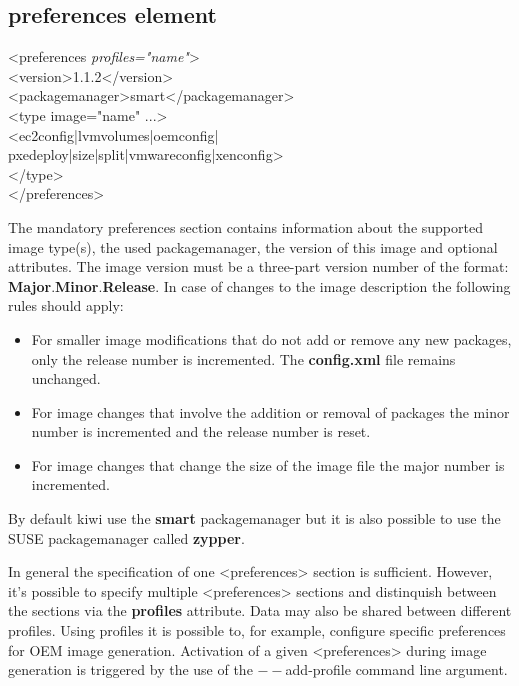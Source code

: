 \subsection{preferences element}
\begin{Command}{14cm}
<preferences \textit{profiles="name"}>\\
\hspace*{1cm}<version>1.1.2</version>\\
\hspace*{1cm}<packagemanager>smart</packagemanager>\\
\hspace*{1cm}<type image="name" ...>\\
\hspace*{2cm}<ec2config|lvmvolumes|oemconfig|\\
\hspace*{2cm} pxedeploy|size|split|vmwareconfig|xenconfig>\\
\hspace*{1cm}</type>\\
</preferences>
\end{Command}

The mandatory preferences section contains information about the supported
image type(s), the used packagemanager, the version of this image and
optional attributes. The image version must be a three-part version number of
the format: \textbf{Major}.\textbf{Minor}.\textbf{Release}. In case of
changes to the image description the following rules should apply:

\begin{itemize}
\item For smaller image modifications that do not add or remove any
      new packages, only the release number is incremented.
      The \textbf{config.xml} file remains unchanged.
\item For image changes that involve the addition or removal of packages
      the minor number is incremented and the release number is reset.
\item For image changes that change the size of the image file
      the major number is incremented.
\end{itemize}

By default kiwi use the \textbf{smart} packagemanager but it is also possible
to use the SUSE packagemanager called \textbf{zypper}. 

In general the specification of one <preferences> section is sufficient.
However, it's possible to specify multiple <preferences> sections and
distinquish between the sections via the \textbf{profiles} attribute. Data
may also be shared between different profiles. Using profiles it is possible
to, for example, configure specific preferences for OEM image generation. 
Activation of a given <preferences> during image generation is triggered by
the use of the $--$add-profile command line argument.

